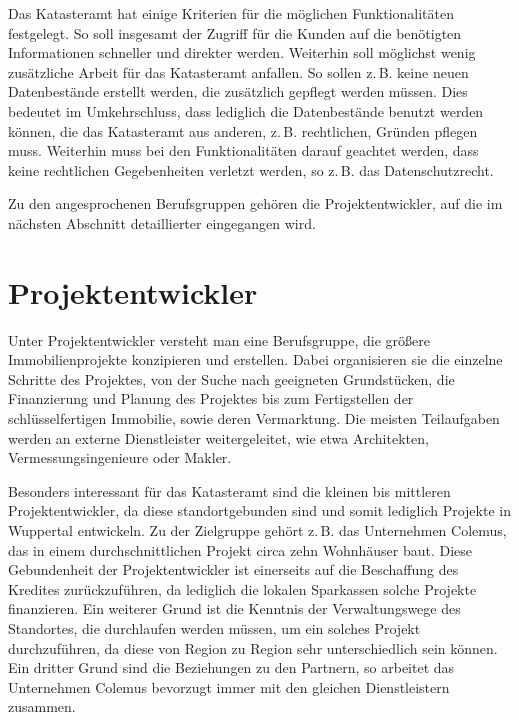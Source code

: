 Das Katasteramt hat einige Kriterien für die möglichen Funktionalitäten festgelegt.
So soll insgesamt der Zugriff für die Kunden auf die benötigten Informationen schneller und direkter werden. Weiterhin soll möglichst wenig zusätzliche Arbeit für das Katasteramt anfallen.
So sollen z.\,B. keine neuen Datenbestände erstellt werden, die zusätzlich gepflegt werden müssen. Dies bedeutet im Umkehrschluss, dass lediglich die Datenbestände benutzt werden können, die das Katasteramt aus anderen, z.\,B. rechtlichen, Gründen pflegen muss.
Weiterhin muss bei den Funktionalitäten darauf geachtet werden, dass keine rechtlichen Gegebenheiten verletzt werden, so z.\,B. das Datenschutzrecht.

Zu den angesprochenen Berufsgruppen gehören die Projektentwickler, auf die im nächsten Abschnitt detaillierter eingegangen wird.



\section{Projektentwickler}

Unter Projektentwickler versteht man eine Berufsgruppe, die größere Immobilienprojekte konzipieren und erstellen.
Dabei organisieren sie die einzelne Schritte des Projektes, von der Suche nach geeigneten Grundstücken, die Finanzierung und Planung des Projektes bis zum Fertigstellen der schlüsselfertigen Immobilie, sowie deren Vermarktung.
Die meisten Teilaufgaben werden an externe Dienstleister weitergeleitet, wie etwa Architekten, Vermessungsingenieure oder Makler.

Besonders interessant für das Katasteramt sind die kleinen bis mittleren Projektentwickler, da diese standortgebunden sind und somit lediglich Projekte in Wuppertal entwickeln.
Zu der Zielgruppe gehört z.\,B. das Unternehmen Colemus, das in einem durchschnittlichen Projekt circa zehn Wohnhäuser baut.
Diese Gebundenheit der Projektentwickler ist einerseits auf die Beschaffung des Kredites zurückzuführen, da lediglich die lokalen Sparkassen solche Projekte finanzieren.
Ein weiterer Grund ist die Kenntnis der Verwaltungswege des Standortes, die durchlaufen werden müssen, um ein solches Projekt durchzuführen, da diese von Region zu Region sehr unterschiedlich sein können.
Ein dritter Grund sind die Beziehungen zu den Partnern, so arbeitet das Unternehmen Colemus bevorzugt immer mit den gleichen Dienstleistern zusammen.


